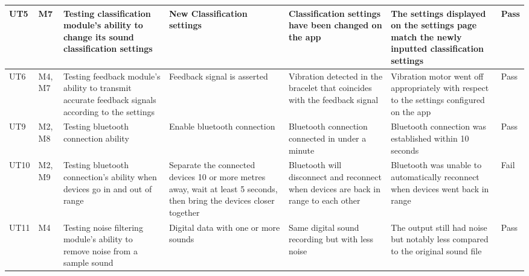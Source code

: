 \documentclass[12pt, titlepage]{article}
\begin{document}
\begin{longtable}{|p{1.4cm}|p{1cm}|p{3cm}|p{1.5cm}|p{2.5cm}|p{2cm}|p{1.2cm}|}
  UT5       &   M7   & Testing classification module's ability to change its sound classification settings                                      & New Classification settings                                  & Classification settings have been changed on the app                    &       The settings displayed on the settings page match the newly inputted classification settings                 &       {\color[HTML]{32CB00} Pass}                                             \\ \hline
  UT6       &   M4, M7   & Testing feedback module's ability to transmit accurate feedback signals according to the settings  & Feedback signal is asserted              & Vibration detected in the bracelet that coincides with the feedback signal                          &      Vibration motor went off appropriately with respect to the settings configured on the app                        &   {\color[HTML]{32CB00} Pass}                    \\ \hline
  UT9       &   M2, M8   & Testing bluetooth connection ability                                     & Enable bluetooth connection                                  & Bluetooth connection connected in under a minute                    &         Bluetooth connection was established within 10 seconds               &             {\color[HTML]{32CB00} Pass}                                       \\ \hline
  UT10      &   M2, M9   & Testing bluetooth connection's ability when devices go in and out of range                                      & Separate the connected devices 10 or more metres away, wait at least 5 seconds, then bring the devices closer together                                  & Bluetooth will disconnect and reconnect when devices are back in range to each other                    &          Bluetooth was unable to automatically reconnect when devices went back in range            &                         {\color[HTML]{FE0000} Fail}                             \\ \hline
  UT11      &   M4   & Testing noise filtering module's ability to remove noise from a sample sound                                      & Digital data with one or more sounds                                  & Same digital sound recording but with less noise                    &          The output still had noise but notably less compared to the original sound file              &                    {\color[HTML]{32CB00} Pass}                                \\ \hline

\end{longtable}
\end{document}
